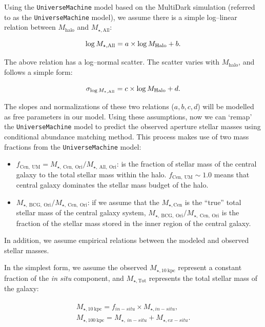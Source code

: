 \documentclass[a4paper,fleqn,usenatbib]{mnras}
\def\mhalo{{$M_{\mathrm{halo}}$}}
\def\mtot{{$M_{\star,\mathrm{Tot}}$}}
\def\minn{{$M_{\star,10\ \mathrm{kpc}}$}}
\def\mall{{$M_{\star,\mathrm{All}}$}}
\def\mcen{{$M_{\star,\mathrm{Cen}}$}}
\def\fraccen{{$M_{\star,\ \mathrm{Cen,\ Ori}} / M_{\star,\ \mathrm{All,\ Ori}}$}}
\def\fracbcg{{$M_{\star,\ \mathrm{BCG,\ Ori}} / M_{\star,\ \mathrm{Cen,\ Ori}}$}}
\def\um{\texttt{UniverseMachine}}
\def\insitu{\textit{in situ}}
\begin{document}
    Using the \um{} model based on the MultiDark simulation (referred to 
    as the \um{} model), we assume there is a simple log--linear relation between 
    \mhalo{} and \mall{}: 

    \begin{equation}
        \log M_{\star, \mathrm{All}} = a \times \log M_{\rm Halo} + b.
    \end{equation}

    The above relation has a log--normal scatter.  
    The scatter varies with \mhalo{}, and follows a simple form: 

    \begin{equation}
        \sigma_{\log{M_{\star, \mathrm{All}}}} = c \times \log M_{\rm Halo} + d.
    \end{equation}
    
    The slopes and normalizations of these two relations ($a, b, c, d$) will be 
    modelled as free parameters in our model.
    Using these assumptions, now we can `remap' the \um{} model to predict 
    the observed aperture stellar masses using conditional abundance matching 
    method. 
    This process makes use of two mass fractions from the \um{} model:
    
    \begin{itemize}
    
        \item $f_{\mathrm{Cen,\ UM}}=$\fraccen{}: 
            is the fraction of stellar mass of the central galaxy to the total 
            stellar mass within the halo. 
            $f_{\mathrm{Cen,\ UM}}\sim 1.0$ means that central galaxy dominates 
            the stellar mass budget of the halo.
                
        \item \fracbcg{}: if we assume that the \mcen{} is the ``true'' total stellar 
            mass of the central galaxy system, \fracbcg{} is the fraction of the 
            stellar mass stored in the inner region of the central galaxy.
 
    \end{itemize}
    
    In addition, we assume empirical relations between the modeled and observed 
    stellar masses. 
    
    In the simplest form, we assume the observed \minn{} represent a constant 
    fraction of the \insitu{} component, and \mtot{} represents the total stellar 
    mass of the galaxy: 
    
    \begin{align}
        \label{eqn:eqlabel}
        \begin{split}
        M_{\star, \mathrm{10\ kpc}} = f_{in-situ} \times M_{\star, in-situ},
        \\
        M_{\star, \mathrm{100\ kpc}} = M_{\star,\ in-situ} + M_{\star, ex-situ}.
        \end{split}
    \end{align}
    
\end{document}
